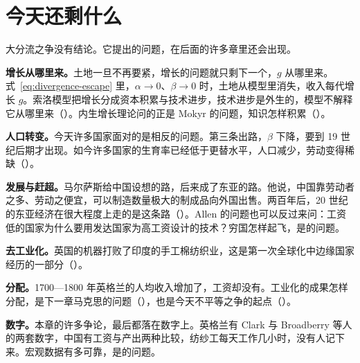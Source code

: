 \section{今天还剩什么}\label{sec:divergence-legacy}

大分流之争没有结论。它提出的问题，在后面的许多章里还会出现。

\textbf{增长从哪里来。}土地一旦不再要紧，增长的问题就只剩下一个，$g$ 从哪里来。式~\eqref{eq:divergence-escape} 里，$\alpha\to0$、$\beta\to0$ 时，土地从模型里消失，收入每代增长 $g$。索洛模型把增长分成资本积累与技术进步，技术进步是外生的，模型不解释它从哪里来（）。内生增长理论问的正是 Mokyr 的问题，知识怎样积累（）。

\textbf{人口转变。}今天许多国家面对的是相反的问题。第三条出路，$\beta$ 下降，要到 19 世纪后期才出现。如今许多国家的生育率已经低于更替水平，人口减少，劳动变得稀缺（）。

\textbf{发展与赶超。}马尔萨斯给中国设想的路，后来成了东亚的路。他说，中国靠劳动者之多、劳动之便宜，可以制造数量极大的制成品向外国出售。两百年后，20 世纪的东亚经济在很大程度上走的是这条路（）。Allen 的问题也可以反过来问：工资低的国家为什么要用发达国家为高工资设计的技术？穷国怎样起飞，是的问题。

\textbf{去工业化。}英国的机器打败了印度的手工棉纺织业，这是第一次全球化中边缘国家经历的一部分（）。

\textbf{分配。}1700—1800 年英格兰的人均收入增加了，工资却没有。工业化的成果怎样分配，是下一章马克思的问题（），也是今天不平等之争的起点（）。

\textbf{数字。}本章的许多争论，最后都落在数字上。英格兰有 Clark 与 Broadberry 等人的两套数字，中国有工资与产出两种比较，纺纱工每天工作几小时，没有人记下来。宏观数据有多可靠，是的问题。

